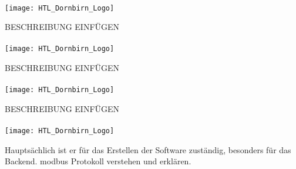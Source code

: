 \paragraph{\fenkart}
\begin{minipage}{0.37\textwidth}
	\centering
	\texttt{[image: HTL\_Dornbirn\_Logo]}
\end{minipage}
\hfill
\begin{minipage}{0.6\textwidth}
	BESCHREIBUNG EINFÜGEN
\end{minipage}%
\vspace{1ex}

\paragraph{\mangeng}
\begin{minipage}{0.37\textwidth}
	\centering
	\texttt{[image: HTL\_Dornbirn\_Logo]}
\end{minipage}
\hfill
\begin{minipage}{0.6\textwidth}
	BESCHREIBUNG EINFÜGEN
\end{minipage}%
\vspace{1ex}

\paragraph{\pezze}
\begin{minipage}{0.37\textwidth}
	\centering
	\texttt{[image: HTL\_Dornbirn\_Logo]}
\end{minipage}
\hfill
\begin{minipage}{0.6\textwidth}
	BESCHREIBUNG EINFÜGEN
\end{minipage}%
\vspace{1ex}

\paragraph{\schneider}
\begin{minipage}{0.37\textwidth}
	\centering
	\texttt{[image: HTL\_Dornbirn\_Logo]}
\end{minipage}
\hfill
\begin{minipage}{0.6\textwidth}
	Hauptsächlich ist er für das Erstellen der Software zuständig, besonders für das Backend. \gls{modbus} Protokoll verstehen und erklären. 
\end{minipage}%
\vspace{1ex}

